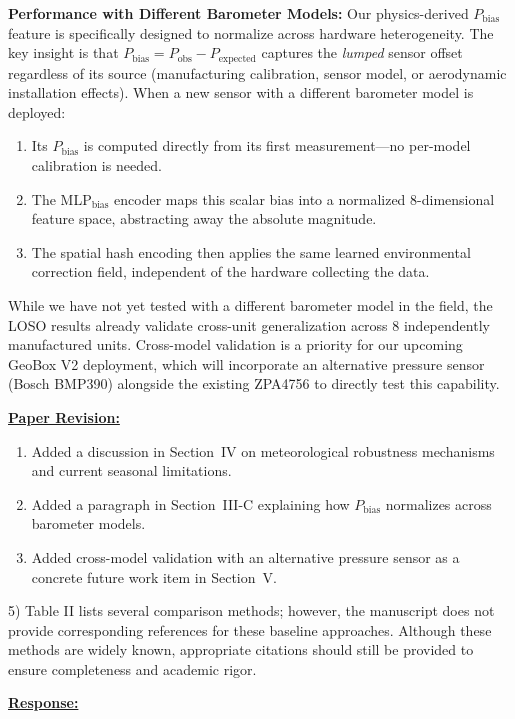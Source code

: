 \textbf{Performance with Different Barometer Models:}
Our physics-derived $P_{\text{bias}}$ feature is specifically designed to normalize across hardware heterogeneity. The key insight is that $P_{\text{bias}} = P_{\text{obs}} - P_{\text{expected}}$ captures the \emph{lumped} sensor offset regardless of its source (manufacturing calibration, sensor model, or aerodynamic installation effects). When a new sensor with a different barometer model is deployed:
\begin{enumerate}
    \item Its $P_{\text{bias}}$ is computed directly from its first measurement---no per-model calibration is needed.
    \item The MLP$_{\text{bias}}$ encoder maps this scalar bias into a normalized 8-dimensional feature space, abstracting away the absolute magnitude.
    \item The spatial hash encoding then applies the same learned environmental correction field, independent of the hardware collecting the data.
\end{enumerate}

While we have not yet tested with a different barometer model in the field, the LOSO results already validate cross-unit generalization across 8 independently manufactured units. Cross-model validation is a priority for our upcoming GeoBox V2 deployment, which will incorporate an alternative pressure sensor (Bosch BMP390) alongside the existing ZPA4756 to directly test this capability.

\vspace{0.1cm}
\noindent
\underline{\textbf{Paper Revision:}}

\begin{enumerate}
    \item Added a discussion in Section~IV on meteorological robustness mechanisms and current seasonal limitations.
    \item Added a paragraph in Section~III-C explaining how $P_{\text{bias}}$ normalizes across barometer models.
    \item Added cross-model validation with an alternative pressure sensor as a concrete future work item in Section~V.
\end{enumerate}

\newpage

\begin{cmttwo}{}{}
5) Table II lists several comparison methods; however, the manuscript does not provide corresponding references for these baseline approaches. Although these methods are widely known, appropriate citations should still be provided to ensure completeness and academic rigor.
\end{cmttwo}
\vspace{0.1cm}
\noindent
\underline{\textbf{Response:}}
\vspace{0.2cm}

